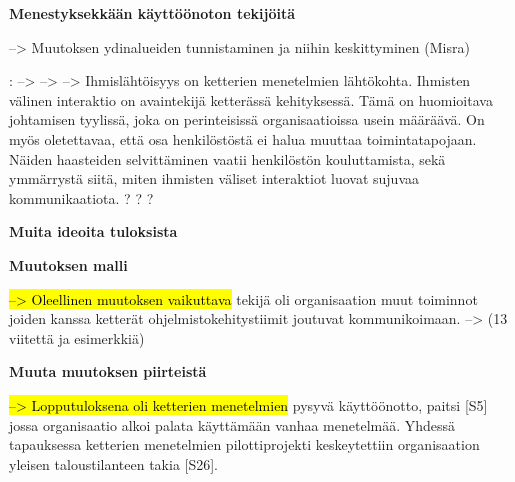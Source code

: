 \clearpage
\large
\textbf{Menestyksekkään käyttöönoton tekijöitä}
\normalsize

--> Muutoksen ydinalueiden tunnistaminen ja niihin keskittyminen (Misra)

: --> -->
--> Ihmislähtöisyys on ketterien menetelmien lähtökohta. Ihmisten välinen
interaktio on avaintekijä ketterässä kehityksessä. Tämä on huomioitava
johtamisen tyylissä, joka on perinteisissä organisaatioissa usein määräävä. On
myös oletettavaa, että osa henkilöstöstä ei halua muuttaa toimintatapojaan.
Näiden haasteiden selvittäminen vaatii henkilöstön kouluttamista, sekä
ymmärrystä siitä, miten ihmisten väliset interaktiot luovat sujuvaa
kommunikaatiota. ? ? ?

\vspace{1cm}
\large
\textbf{Muita ideoita tuloksista}
\normalsize

\textbf{Muutoksen malli}

\hl{--> Oleellinen muutoksen vaikuttava} tekijä oli organisaation muut toiminnot
joiden kanssa ketterät ohjelmistokehitystiimit joutuvat kommunikoimaan.
--> (13 viitettä ja esimerkkiä)

\textbf{Muuta muutoksen piirteistä}

\hl{--> Lopputuloksena oli ketterien menetelmien} pysyvä käyttöönotto, paitsi [S5]
jossa organisaatio alkoi palata käyttämään vanhaa menetelmää. Yhdessä
tapauksessa ketterien menetelmien pilottiprojekti keskeytettiin
organisaation yleisen taloustilanteen takia [S26].
